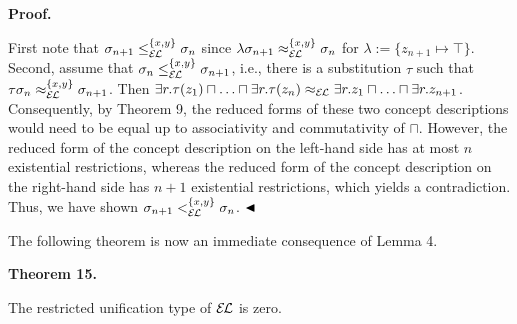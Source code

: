  
 
 
 
\par\medskip\noindent\textbf{Proof.}\par
 
 
First note that $\sigma_{n+1}\leq_{\mathcal{E\mkern-1.618muL}}^{\{x,y\}}\sigma_{n}$ since $\lambda\sigma_{n+1}\approx_{\mathcal{E\mkern-1.618muL}}^{\{x,y\}}\sigma_{n}$ for $\lambda:=\{z_{n+1}\mapsto\top\}$. Second, assume that $\sigma_{n}\leq_{\mathcal{E\mkern-1.618muL}}^{\{x,y\}}\sigma_{n+1}$, i.e., there is a substitution $\tau$ such that $\tau\sigma_{n}\approx_{\mathcal{E\mkern-1.618muL}}^{\{x,y\}}\sigma_{n+1}$. Then $\exists r.\tau(z_{1})\sqcap\ldots\sqcap\exists r.\tau(z_{n})\approx_{\mathcal{%
E\mkern-1.618muL}}\exists r.z_{1}\sqcap\ldots\sqcap\exists r.z_{n+1}$. Consequently, by Theorem 9, the reduced forms of these two concept descriptions would need to be equal up to associativity and commutativity of $\sqcap$. However, the reduced form of the concept description on the left-hand side has at most $n$ existential restrictions, whereas the reduced form of the concept description on the right-hand side has $n+1$ existential restrictions, which yields a contradiction. Thus, we have shown $\sigma_{n+1}<_{\mathcal{E\mkern-1.618muL}}^{\{x,y\}}\sigma_{n}$. $\hfill\blacktriangleleft$\par
 
 
 
The following theorem is now an immediate consequence of Lemma 4.\par
 
 
 
\par\medskip\noindent\textbf{Theorem 15.}\par
 
 
The restricted unification type of $\mathcal{E\mkern-1.618muL}$ is zero.\par
 
 
 
